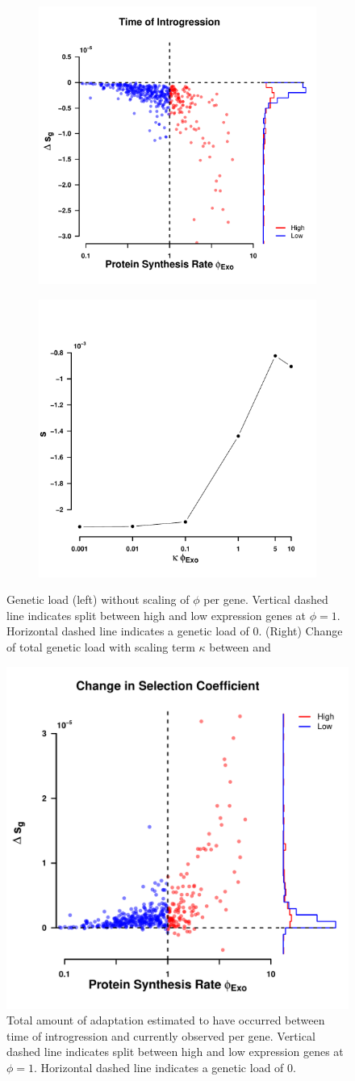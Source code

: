 \documentclass[fleqn,letterpaper]{article}
\begin{document}
\begin{figure}
    \centering
    \begin{subfigure}
        \centering
        \includegraphics[width=.45\textwidth]{img/fitness_difference_gos_kappa1.pdf}
    \end{subfigure}
    \begin{subfigure}
        \centering
        \includegraphics[width=.45\textwidth]{img/fitness_phi_scaling_gos.pdf}
    \end{subfigure}
    \caption{Genetic load (left) without scaling of $\phi$ per gene. 
    Vertical dashed line indicates split between high and low expression genes at $\phi = 1$.
    Horizontal dashed line indicates a genetic load of 0.
     (Right) Change of total genetic load with scaling term $\kappa$ between \gossypii and \kluyveri}
    \label{fig:sne_scaling}
\end{figure}
\null
\vfill
\clearpage
\null
\vfill
\begin{figure}
     \centering
	\includegraphics[width=.5\textwidth]{img/adaptation_total.pdf}
	\caption{Total amount of adaptation estimated to have occurred between time of introgression and currently observed per gene.
	    Vertical dashed line indicates split between high and low expression genes at $\phi = 1$.
	    Horizontal dashed line indicates a genetic load of 0.}
	\label{fig:adapt_tot}
\end{figure}
\end{document}
